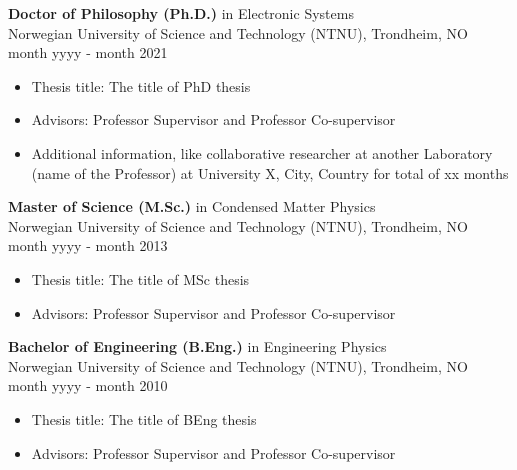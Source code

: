 \noindent \textbf{Doctor of Philosophy (Ph.D.)} in Electronic Systems\\ Norwegian University of Science and Technology (NTNU), Trondheim, NO\\ month yyyy - month 2021
    \vspace{-0.2cm}
    \begin{itemize}[itemsep=0.7pt, parsep=0.7pt, leftmargin=7mm, label=] %
        \item Thesis title: The title of PhD thesis
        \item Advisors: Professor Supervisor and Professor Co-supervisor
        \item Additional information, like collaborative researcher at another Laboratory (name of the Professor) at University X, City, Country for total of xx months
    \end{itemize}
    \vspace{0.5mm}
    
\noindent \textbf{Master of Science (M.Sc.)} in Condensed Matter Physics\\ Norwegian University of Science and Technology (NTNU), Trondheim, NO\\ month yyyy - month 2013
    \vspace{-0.2cm}
    \begin{itemize}[itemsep=0.7pt, parsep=0.7pt, leftmargin=7mm, label=] %
        \item Thesis title: The title of MSc thesis
        \item Advisors: Professor Supervisor and Professor Co-supervisor
    \end{itemize}
    \vspace{0.5mm}
    
\noindent \textbf{Bachelor of Engineering (B.Eng.)} in Engineering Physics\\ Norwegian University of Science and Technology (NTNU), Trondheim, NO\\ month yyyy - month 2010
    \vspace{-0.2cm}
    \begin{itemize}[itemsep=0.7pt, parsep=0.7pt, leftmargin=7mm, label=] %
        \item Thesis title: The title of BEng thesis
        \item Advisors: Professor Supervisor and Professor Co-supervisor
    \end{itemize}

